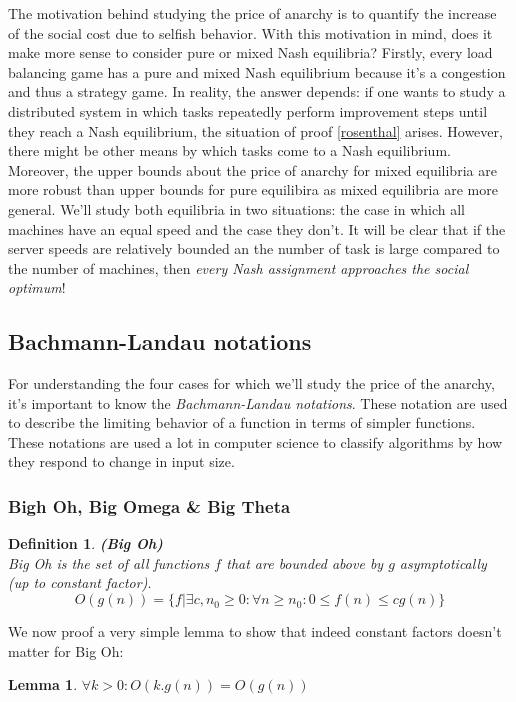 \documentclass[a4paper,11pt]{article}
\newtheorem{lemma}[theorem]{Lemma}
\newtheorem{definition}[theorem]{Definition}
\begin{document}
The motivation behind studying the price of anarchy is to quantify the increase of the social cost due to selfish behavior. With this motivation in mind, does it make more sense to consider pure or mixed Nash equilibria? Firstly, every load balancing game has a pure and mixed Nash equilibrium because it's a congestion and thus a strategy game. In reality, the answer depends: if one wants to study a distributed system in which tasks repeatedly perform improvement steps until they reach a Nash equilibrium, the situation of proof \ref{rosenthal} arises. However, there might be other means by which tasks come to a Nash equilibrium. Moreover, the upper bounds about the price of anarchy for mixed equilibria are more robust than upper bounds for pure equilibira as mixed equilibria are more general. We'll study both equilibria in two situations: the case in which all machines have an equal speed and the case they don't. It will be clear that if the server speeds are relatively bounded an the number of task is large compared to the number of machines, then \emph{every Nash assignment approaches the social optimum}!

\subsection{Bachmann-Landau notations}
For understanding the four cases for which we'll study the price of the anarchy, it's important to know the \emph{Bachmann-Landau notations}. These notation are used to describe the limiting behavior of a function in terms of simpler functions. These notations are used a lot in computer science to classify algorithms by how they respond to change in input size.

\subsubsection{Bigh Oh, Big Omega \& Big Theta}
\begin{definition}\textbf{(Big Oh)}\cite{11}\\
Big Oh is the set of all functions $f$ that are bounded above by $g$ asymptotically (up to constant factor).
$$O(g(n)) = \{f|\exists c, n_0 \geq 0: \forall n \geq n_0 : 0 \leq f(n) \leq cg(n)\}$$
\end{definition}
We now proof a very simple lemma to show that indeed constant factors doesn't matter for Big Oh:
\begin{lemma}\label{constanten}
$\forall k > 0: O(k.g(n)) = O(g(n))$
\end{lemma}
\end{document}
